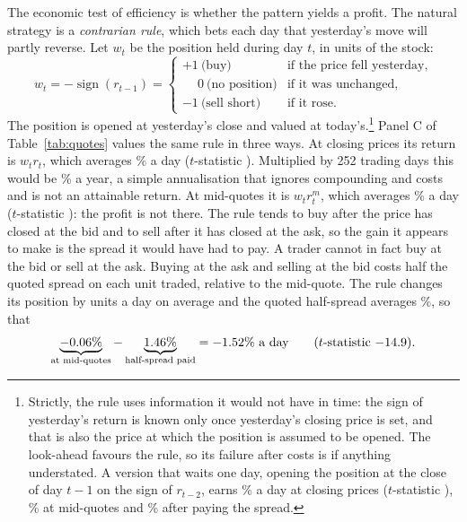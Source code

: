 \documentclass[11pt,a4paper]{article}
\begin{document}
The economic test of efficiency is whether the pattern yields a profit. The natural strategy is a \emph{contrarian rule}, which bets each day that yesterday's move will partly reverse. Let $w_t$ be the position held during day $t$, in units of the stock:
\begin{equation}
w_t=-\operatorname{sign}(r_{t-1})=
\begin{cases}
+1 \ \text{(buy)} & \text{if the price fell yesterday,}\\
\phantom{+}0 \ \text{(no position)} & \text{if it was unchanged,}\\
-1 \ \text{(sell short)} & \text{if it rose.}
\end{cases}
\end{equation}
The position is opened at yesterday's close and valued at today's.\footnote{Strictly, the rule uses information it would not have in time: the sign of yesterday's return is known only once yesterday's closing price is set, and that is also the price at which the position is assumed to be opened. The look-ahead favours the rule, so its failure after costs is if anything understated. A version that waits one day, opening the position at the close of day $t-1$ on the sign of $r_{t-2}$, earns \lagClose\% a day at closing prices ($t$-statistic \lagCloseT), \lagMid\% at mid-quotes and \lagNet\% after paying the spread.} Panel C of Table~\ref{tab:quotes} values the same rule in three ways. At closing prices its return is $w_t r_t$, which averages \conGross\% a day ($t$-statistic \conGrossT). Multiplied by 252 trading days this would be \conAnn\% a year, a simple annualisation that ignores compounding and costs and is not an attainable return. At mid-quotes it is $w_t r^{m}_t$, which averages \conMid\% a day ($t$-statistic \conMidT): the profit is not there. The rule tends to buy after the price has closed at the bid and to sell after it has closed at the ask, so the gain it appears to make is the spread it would have had to pay. A trader cannot in fact buy at the bid or sell at the ask. Buying at the ask and selling at the bid costs half the quoted spread on each unit traded, relative to the mid-quote. The rule changes its position by \conTurn{} units a day on average and the quoted half-spread averages \conHalf\%, so that
\begin{equation*}
\underbrace{-0.06\%}_{\text{at mid-quotes}}-\underbrace{1.46\%}_{\text{half-spread paid}}=-1.52\%\ \text{a day}\qquad(t\text{-statistic }{\ensuremath{-}14.9}).
\end{equation*}
\end{document}
